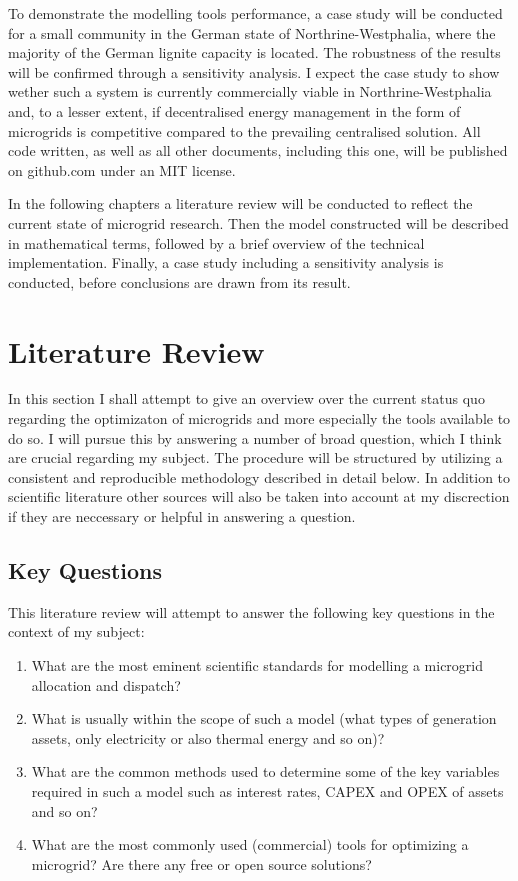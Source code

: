 \documentclass[
	11pt,								%
	DIV10,								%
	a4paper,         					%
	oneside,							%
	headheight=20pt,					%
	footheight=20pt,					%
    parskip=full,						%
    listof=totoc,						%
	bibliography=totoc,					%
	index=totoc,						%
]{scrartcl}
\begin{document}
To demonstrate the modelling tools performance, a case study will be conducted for a small community in the German state of Northrine-Westphalia, where the majority of the German lignite capacity is located. The robustness of the results will be confirmed through a sensitivity analysis.
I expect the case study to show wether such a system is currently commercially viable in Northrine-Westphalia and, to a lesser extent, if decentralised energy management in the form of microgrids is competitive compared to the prevailing centralised solution.
All code written, as well as all other documents, including this one, will be published on github.com  under an MIT license.

In the following chapters a literature review will be conducted to reflect the current state of microgrid research. Then the model constructed will be described in mathematical terms, followed by a brief overview of the technical implementation. Finally, a case study including a sensitivity analysis is conducted, before conclusions are drawn from its result.

\newpage

\section{Literature Review}
In this section I shall attempt to give an overview over the current status quo regarding the optimizaton of microgrids and more especially the tools available to do so. I will pursue  this by answering a number of broad question, which I think are crucial regarding my subject. The procedure will be structured by utilizing a consistent and reproducible methodology described in detail below. In addition to scientific literature other sources will also be taken into account at my discrection if they are neccessary or helpful in answering a question.

\subsection{Key Questions}
This literature review will attempt to answer the following key questions in the context of my subject:
\begin{enumerate}
	\item What are the most eminent scientific standards for modelling a microgrid allocation and dispatch?
	\item What is usually within the scope of such a model (what types of generation assets, only electricity or also thermal energy and so on)? 
	\item What are the common methods used to determine some of the key variables required in such a model such as interest rates, CAPEX and OPEX of assets and so on?
	\item What are the most commonly used (commercial) tools for optimizing a microgrid? Are there any free or open source solutions? 
\end{enumerate} 
\end{document}
